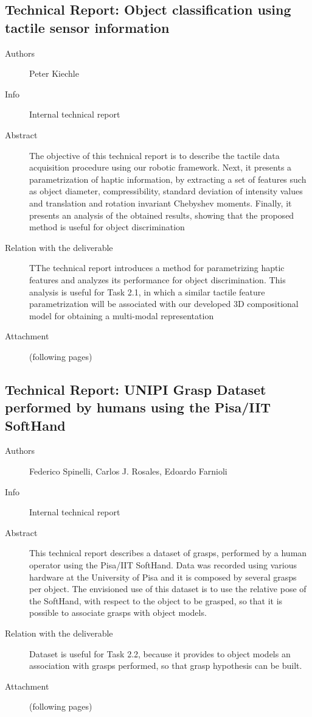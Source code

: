 \documentclass[a4paper,11pt,pdf]{pacmanreport}
\begin{document}
\subsection{Technical Report: Object classification using tactile sensor information} \label{ann:techReportKiechle}
\begin{description}
\item[Authors] Peter Kiechle
\item[Info] Internal technical report
\item[Abstract] The objective of this technical report is to describe the 
tactile data acquisition procedure using our robotic framework. Next, it presents 
a parametrization of haptic information, by extracting a set of features such as 
object diameter, compressibility, standard deviation of intensity values and 
translation and rotation invariant Chebyshev moments. Finally, it presents an 
analysis of the obtained results, showing that the proposed method is useful for 
object discrimination
\item[Relation with the deliverable] TThe technical report introduces a method for parametrizing haptic features and 
analyzes its performance for object discrimination. This analysis is useful for 
Task 2.1, in which a similar tactile feature parametrization will be associated 
with our developed 3D compositional model for obtaining a multi-modal 
representation
\item[Attachment] (following pages)
\end{description}


\subsection{Technical Report: UNIPI Grasp Dataset performed by humans using the Pisa/IIT SoftHand} \label{ann:techReportFederico}
\begin{description}
\item[Authors] Federico Spinelli, Carlos J. Rosales, Edoardo Farnioli
\item[Info] Internal technical report
\item[Abstract] This technical report describes a dataset of grasps, performed by a human operator 
  using the Pisa/IIT SoftHand. Data was recorded using various hardware at
the University of Pisa and it is composed by several grasps per object. The envisioned 
use of this dataset is to use the relative pose of the SoftHand, with respect to the object to
be grasped, so that it is possible to associate grasps with object models.
\item[Relation with the deliverable] Dataset is useful for Task 2.2, because it provides 
  to object models an association with grasps performed, so that grasp hypothesis can be built. 
\item[Attachment] (following pages)
\end{description}

\end{document}
